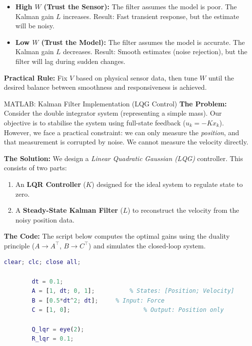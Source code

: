 \begin{itemize}
	\item \textbf{High $W$ (Trust the Sensor):} The filter assumes the model is poor. The Kalman gain $L$ increases. Result: Fast transient response, but the estimate will be noisy.
	\item \textbf{Low $W$ (Trust the Model):} The filter assumes the model is accurate. The Kalman gain $L$ decreases. Result: Smooth estimates (noise rejection), but the filter will lag during sudden changes.
\end{itemize}

\textbf{Practical Rule:} Fix $V$ based on physical sensor data, then tune $W$ until the desired balance between smoothness and responsiveness is achieved.

\begin{examplebox}{MATLAB: Kalman Filter Implementation (LQG Control)}
	\textbf{The Problem:}
	Consider the double integrator system (representing a simple mass). Our objective is to stabilise the system using full-state feedback ($u_k = -K x_k$). However, we face a practical constraint: we can only measure the \emph{position}, and that measurement is corrupted by noise. We cannot measure the velocity directly.
	
	\textbf{The Solution:}
	We design a \emph{Linear Quadratic Gaussian (LQG)} controller. This consists of two parts:
	\begin{enumerate}
		\item An \textbf{LQR Controller} ($K$) designed for the ideal system to regulate state to zero.
		\item A \textbf{Steady-State Kalman Filter} ($L$) to reconstruct the velocity from the noisy position data.
	\end{enumerate}
	
	\textbf{The Code:}
	The script below computes the optimal gains using the duality principle ($A \to A^\top$, $B \to C^\top$) and simulates the closed-loop system.
	
	\begin{lstlisting}[language=Matlab, caption={Closed-loop simulation of LQR control using Kalman Filter estimates.}, label=lst:kalman_code]
		clear; clc; close all;
		
		dt = 0.1;
		A = [1, dt; 0, 1];     		% States: [Position; Velocity]
		B = [0.5*dt^2; dt];    	% Input: Force
		C = [1, 0];            			% Output: Position only
		
		Q_lqr = eye(2);        
		R_lqr = 0.1;           
		

\end{lstlisting}
\end{examplebox}
